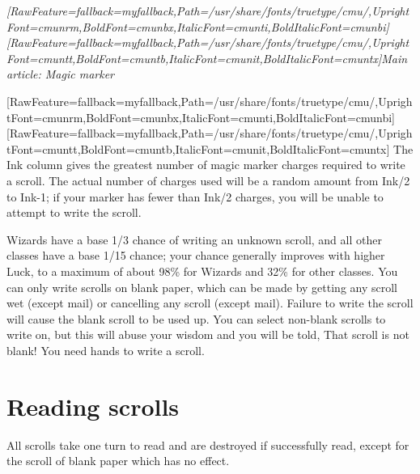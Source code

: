 \begin{myquote}
\item{}{\itshape \allowbreak{}\setmainfont{cmunti.ttf}[RawFeature={fallback=myfallback},Path=/usr/share/fonts/truetype/cmu/,UprightFont=cmunrm,BoldFont=cmunbx,ItalicFont=cmunti,BoldItalicFont=cmunbi]\setmonofont{cmunti.ttf}[RawFeature={fallback=myfallback},Path=/usr/share/fonts/truetype/cmu/,UprightFont=cmuntt,BoldFont=cmuntb,ItalicFont=cmunit,BoldItalicFont=cmuntx]\itshape Main article: Magic marker\footnotemark[70]}
\end{myquote}
\allowbreak{}\setmainfont{cmunrm.ttf}[RawFeature={fallback=myfallback},Path=/usr/share/fonts/truetype/cmu/,UprightFont=cmunrm,BoldFont=cmunbx,ItalicFont=cmunti,BoldItalicFont=cmunbi]\setmonofont{cmunrm.ttf}[RawFeature={fallback=myfallback},Path=/usr/share/fonts/truetype/cmu/,UprightFont=cmuntt,BoldFont=cmuntb,ItalicFont=cmunit,BoldItalicFont=cmuntx]
The Ink column gives the greatest number of magic marker\footnotemark[71] charges required to write a scroll. The actual number of charges used will be a random amount from Ink/2 to Ink-{}1; if your marker has fewer than Ink/2 charges, you will be unable to attempt to write the scroll.


Wizards have a base 1/3 chance of writing an unknown scroll, and all other classes have a base 1/15 chance; your chance generally improves with higher Luck\footnotemark[72], to a maximum of about 98\% for Wizards and 32\% for other classes. You can only write scrolls on blank paper, which can be made by getting any scroll wet (except mail) or cancelling any scroll (except mail). Failure to write the scroll will cause the blank scroll to be used up. You can select non-{}blank scrolls to write on, but this will abuse your wisdom and you will be told, That scroll is not blank! You need hands to write a scroll.



\section{Reading scrolls}
\label{4}
All scrolls take one turn to read and are destroyed if successfully read, except for the scroll of blank paper\footnotemark[73] which has no effect.


